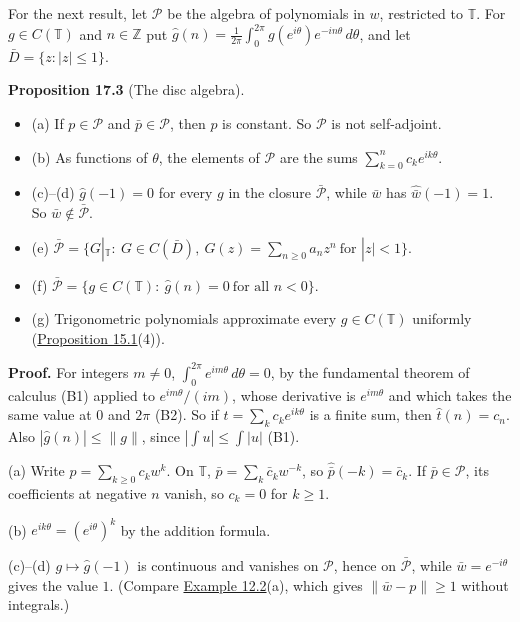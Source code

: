 \documentclass[
  english,
  11pt,
  a4paper,
]{article}
\providecommand{\tightlist}{%
  \setlength{\itemsep}{0pt}\setlength{\parskip}{0pt}}
\begin{document}
For the next result, let \(\mathcal P\) be the algebra of polynomials in
\(w\), restricted to \(\mathbb T\). For \(g\in C(\mathbb T)\) and
\(n\in\mathbb Z\) put
\(\hat g(n)=\frac1{2\pi}\int_0^{2\pi}g(e^{i\theta})e^{-in\theta}\,d\theta\),
and let \(\bar D=\{z:|z|\leq1\}\).

\textbf{Proposition 17.3} (The disc algebra).

\begin{itemize}
\tightlist
\item
  (a) If \(p\in\mathcal P\) and \(\bar p\in\mathcal P\), then \(p\) is
  constant. So \(\mathcal P\) is not self-adjoint.
\item
  (b) As functions of \(\theta\), the elements of \(\mathcal P\) are the
  sums \(\sum_{k=0}^nc_ke^{ik\theta}\).
\item
  (c)--(d) \(\hat g(-1)=0\) for every \(g\) in the closure
  \(\bar{\mathcal P}\), while \(\bar w\) has \(\hat{\bar w}(-1)=1\). So
  \(\bar w\notin\bar{\mathcal P}\).
\item
  (e)
  \(\bar{\mathcal P}=\{G|_{\mathbb T}:\ G\in C(\bar D),\ G(z)=\sum_{n\geq0}a_nz^n\ \text{for }|z|<1\}\).
\item
  (f)
  \(\bar{\mathcal P}=\{g\in C(\mathbb T):\ \hat g(n)=0\ \text{for all }n<0\}\).
\item
  (g) Trigonometric polynomials approximate every \(g\in C(\mathbb T)\)
  uniformly
  (\hyperlink{the-stone-weierstrass-theorem-for-functions-vanishing-at-infinity--oa-fnd-sw-17}{Proposition
  15.1}(4)).
\end{itemize}

\textbf{Proof.} For integers \(m\neq0\),
\(\int_0^{2\pi}e^{im\theta}\,d\theta=0\), by the fundamental theorem of
calculus (B1) applied to \(e^{im\theta}/(im)\), whose derivative is
\(e^{im\theta}\) and which takes the same value at \(0\) and \(2\pi\)
(B2). So if \(t=\sum_kc_ke^{ik\theta}\) is a finite sum, then
\(\hat t(n)=c_n\). Also \(|\hat g(n)|\leq\|g\|\), since
\(|\int u|\leq\int|u|\) (B1).

(a) Write \(p=\sum_{k\geq0}c_kw^k\). On \(\mathbb T\),
\(\bar p=\sum_k\bar c_kw^{-k}\), so \(\hat{\bar p}(-k)=\bar c_k\). If
\(\bar p\in\mathcal P\), its coefficients at negative \(n\) vanish, so
\(c_k=0\) for \(k\geq1\).

(b) \(e^{ik\theta}=(e^{i\theta})^k\) by the addition formula.

(c)--(d) \(g\mapsto\hat g(-1)\) is continuous and vanishes on
\(\mathcal P\), hence on \(\bar{\mathcal P}\), while
\(\bar w=e^{-i\theta}\) gives the value \(1\). (Compare
\hyperlink{the-stone-weierstrass-theorem-for-functions-vanishing-at-infinity--oa-fnd-sw-11}{Example
12.2}(a), which gives \(\|\bar w-p\|\geq1\) without integrals.)
\end{document}
